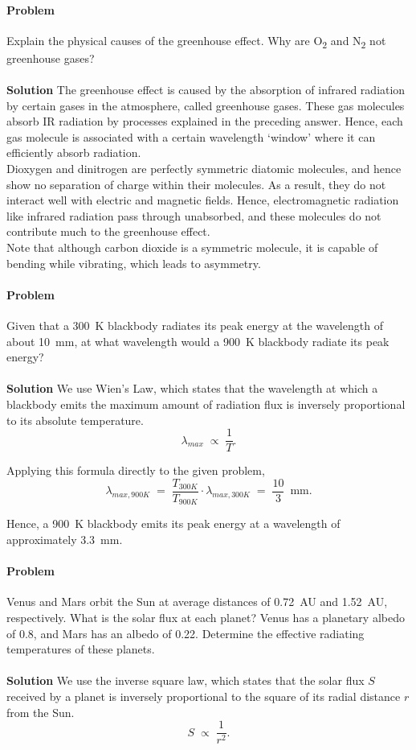 \documentclass[10pt]{article}
\newcounter{prob}
\def\problem{\stepcounter{prob}\paragraph{Problem \arabic{prob}}}
\def\solution{\\\\\textbf{Solution }}
\begin{document}
        \problem Explain the physical causes of the greenhouse effect. Why are O\textsubscript{2} and N\textsubscript{2} not greenhouse gases?
        \solution The greenhouse effect is caused by the absorption of infrared radiation by certain gases in the atmosphere, called 
        greenhouse gases. These gas molecules absorb IR radiation by processes explained in the preceding answer. Hence, each 
        gas molecule is associated with a certain wavelength `window' where it can efficiently absorb radiation. \\
        Dioxygen and dinitrogen are perfectly symmetric diatomic molecules, and hence show no separation of charge within their molecules.
        As a result, they do not interact well with electric and magnetic fields. Hence, electromagnetic radiation like infrared
        radiation pass through unabsorbed, and these molecules do not contribute much to the greenhouse effect.\\
        Note that although carbon dioxide is a symmetric molecule, it is capable of bending while vibrating, which leads to 
        asymmetry.

        \problem Given that a \SI{300}{\kelvin} blackbody radiates its peak energy at the wavelength of about \SI{10}{\mm}, at what wavelength
        would a \SI{900}{\kelvin} blackbody radiate its peak energy?
        \solution We use Wien's Law, which states that the wavelength at which a blackbody emits the maximum amount of radiation flux
        is inversely proportional to its absolute temperature.
        \[
        \lambda_{max} \;\propto\; \frac{1}{T}.
        \]

        Applying this formula directly to the given problem,
        \[
        \lambda_{max, 900K} \;=\; \frac{T_{300K}}{T_{900K}}\cdot\lambda_{max, 300K} \;=\; \frac{10}{3}\; \SI{}{\mm}.
        \]
        
        Hence, a \SI{900}{\kelvin} blackbody emits its peak energy at a wavelength of approximately \SI{3.3}{\mm}.

        \problem Venus and Mars orbit the Sun at average distances of \SI{0.72}{AU} and \SI{1.52}{AU}, respectively.
        What is the solar flux at each planet? Venus has a planetary albedo of 0.8, and Mars has an albedo of 0.22.
        Determine the effective radiating temperatures of these planets.
        \solution We use the inverse square law, which states that the solar flux $S$ received by a planet is inversely proportional
        to the square of its radial distance $r$ from the Sun.
        \[
        S \;\propto\; \frac{1}{r^2}.
        \]
\end{document}
